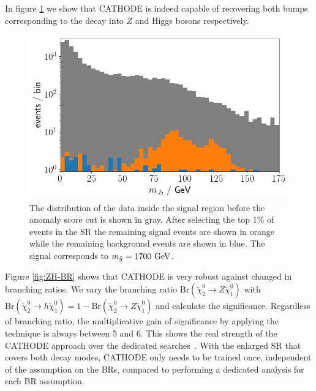 \documentclass[prd, twocolumn, superscriptaddress,floatfix, nofootinbib, preprintnumbers]{revtex4-2}
\begin{document}
In figure \ref{fig:ZH-SignalShape} we show that CATHODE is indeed capable of recovering both bumps corresponding to the decay into $Z$ and Higgs bosons respectively.

\begin{figure}[t]
\centering
\includegraphics[width=0.9\linewidth]{ZH_Signal.png}
\caption{The distribution of the data inside the signal region before the anomaly score cut is shown in gray. After selecting the top 1\% of events in the SR the remaining signal events are shown in orange while the remaining background events are shown in blue. The signal corresponds to $m_{\tilde{g}}=1700~{\rm GeV}$. }
\label{fig:ZH-SignalShape}
\end{figure}
Figure \ref{fig:ZH-BR} shows that CATHODE is very robust against changed in branching ratios. We vary the branching ratio $\text{Br}( \widetilde{\chi}_2^0 \rightarrow Z \widetilde{\chi}_1^0)$ with $\text{Br}( \widetilde{\chi}_2^0 \rightarrow h \widetilde{\chi}_1^0)=1-\text{Br}( \widetilde{\chi}_2^0 \rightarrow Z \widetilde{\chi}_1^0)$ and calculate the significance. Regardless of branching ratio, the multiplicative gain of significance by applying the technique is always between 5 and 6. This shows the real strength of the CATHODE approach over the dedicated searches~\cite{CMS:2020fia,CMS:2022vpy,CMS:2017may}. With the enlarged SR that covers both decay modes, CATHODE only needs to be trained once, independent of the assumption on the BRs, compared to performing a dedicated analysis for each BR assumption. 
\end{document}
